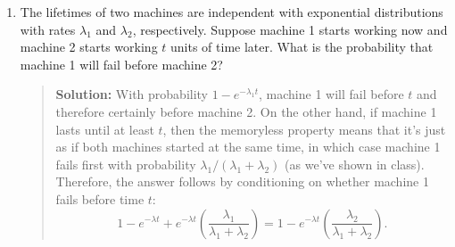 \documentclass{article}
\begin{document}
\begin{enumerate}
\begin{quotation}{\bf Solution:}
  Let us now demonstrate that the $P$ chain satisfies detailed balance with the $\pi$ vector.  
  This will imply in turn that the $\pi$ matrix is a stationary probability, which means that the chain
  is positive recurrent, so that the chain is ergodic and we are done.  For any $i\ne j$, 
  we prove detailed balance by considering three cases:
  \begin{itemize}
  \item If $Q_{ij}=Q_{ji}=0$, then $P_{ij}=P_{ji}=0$ and $\pi_iP_{ij}=\pi_jP_{ji}$ is trivial.
  \item If $\pi_jQ_{ji}\ge \pi_iQ_{ij}$, then $\alpha(i,j)=1$ and $\alpha(j,i)=\pi_iQ_{ij}/(\pi_jQ_{ji})$. Therefore,
  \[
  \pi_jP_{ji} = \pi_j \frac{\pi_i Q_{ij} }{\pi_j Q_{ji}} Q_{ji} = \pi_i Q_{ij} = \pi_iP_{ij}.
  \]
  \item If $\pi_jQ_{ji}\le \pi_iQ_{ij}$, then $\alpha(j,i)=1$ and $\alpha(i,j)=\pi_jQ_{ji}/(\pi_iQ_{ij})$. Therefore,
  \[
  \pi_iP_{ij} = \pi_i \frac{\pi_j Q_{ji} }{\pi_i Q_{ij}} Q_{ij} = \pi_j Q_{ji} = \pi_jP_{ji}.
  \]
  \end{itemize}  
  \end{quotation}

\item The lifetimes of two machines are independent with exponential
distributions with rates $\lambda_1$ and $\lambda_2$, respectively. Suppose
machine 1 starts working now and machine 2 starts working $t$ units of time
later. What is the probability that machine 1 will fail before machine 2?
  \begin{quotation}{\bf Solution:}
  With probability $1-e^{-\lambda_1 t}$, machine 1 will fail before $t$ and therefore certainly
  before machine 2.  
  On the other hand, if machine 1 lasts until at least $t$, then the memoryless property means that
  it's just as if both machines started at the same time, in which case machine 1 fails first
  with probability $\lambda_1/(\lambda_1+\lambda_2)$ (as we've shown in class). 
  Therefore, the answer follows by conditioning on whether machine 1 fails before time $t$:
  \[
  1-e^{-\lambda t} + e^{-\lambda t} \left( \frac{\lambda_1}{\lambda_1 + \lambda_2} \right) =
  1 - e^{-\lambda t} \left( \frac{\lambda_2}{\lambda_1 + \lambda_2} \right).
  \]
  \end{quotation}

\end{enumerate}
\end{document}
